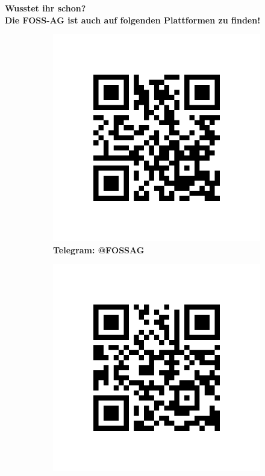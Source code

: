 \documentclass[a4paper,12pt,twoside]{article}
\begin{document}
	\begin{landscape}
			\begin{center}
			\Huge\textbf{Wusstet ihr schon?\\Die FOSS-AG ist auch auf folgenden Plattformen zu finden!}\\
		\end{center}
		\begin{figure}[h]
			\begin{subfigure}[h]{0.47\textwidth}
				\includegraphics[scale=0.6]{codes/telegram.png}
				\caption*{\Large \textbf{Telegram: @FOSSAG}}
			\end{subfigure}
			\begin{subfigure}[h]{0.47\textwidth}
				\includegraphics[scale=0.6]{codes/twitter.png}

\end{subfigure}
\end{figure}
\end{landscape}
\end{document}
